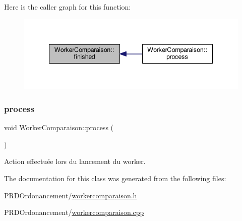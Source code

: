 Here is the caller graph for this function\+:
\nopagebreak
\begin{figure}[H]
\begin{center}
\leavevmode
\includegraphics[width=340pt]{classWorkerComparaison_a22ed9afba5f29d89a014b2b895d995b2_icgraph}
\end{center}
\end{figure}
\mbox{\label{classWorkerComparaison_ac62afd6b36f0c1590e5f3878334a9928}} 
\subsubsection{\texorpdfstring{process}{process}}
{\footnotesize\ttfamily void Worker\+Comparaison\+::process (\begin{DoxyParamCaption}{ }\end{DoxyParamCaption})\hspace{0.3cm}{\ttfamily [slot]}}



Action effectuée lors du lancement du worker. 



The documentation for this class was generated from the following files\+:\begin{DoxyCompactItemize}
\item 
P\+R\+D\+Ordonancement/\hyperlink{workercomparaison_8h}{workercomparaison.\+h}\item 
P\+R\+D\+Ordonancement/\hyperlink{workercomparaison_8cpp}{workercomparaison.\+cpp}\end{DoxyCompactItemize}
